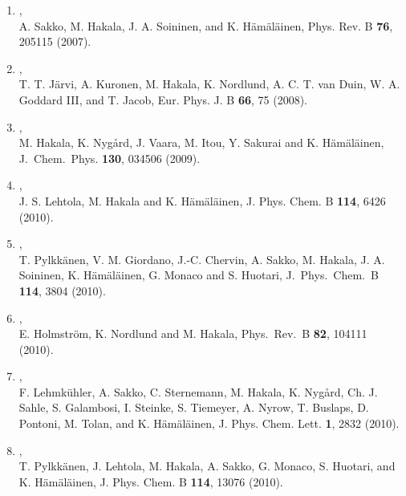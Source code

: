\documentclass[12pt,a4]{report}
\begin{document}
\begin{enumerate}
\item{},\\ A. Sakko, M. Hakala, J. A. Soininen, and K. H\"am\"al\"ainen,  
Phys. Rev. B {\bf 76}, 205115 (2007).

\item{},\\  T. T. J\"arvi, A. Kuronen, M. Hakala, K. Nordlund, A. C. T. van Duin, W. A. Goddard III, and T. Jacob,
Eur. Phys. J. B {\bf 66}, 75 (2008). 

\item{},\\ M. Hakala, K. Nyg\aa rd, 
J. Vaara, M. Itou, Y. Sakurai and K. H\"am\"al\"ainen,
J.~Chem.~Phys. {\bf 130}, 034506 (2009). 

\item{},\\ J. S. Lehtola, M. Hakala and K. H\"am\"al\"ainen, J. Phys. Chem. B {\bf 114}, 6426 (2010).

\item{},\\ T. Pylkk{\"a}nen, V. M. Giordano, J.-C. Chervin, A. Sakko, M. Hakala, J. A. Soininen, K. H\"am\"al\"ainen, G. Monaco and S. Huotari, J.\ Phys.\ Chem.\ B {\bf 114}, 3804 (2010).

\item{},\\ E. Holmstr{\"o}m, K. Nordlund and M. Hakala, Phys.\ Rev.\ B {\bf 82}, 104111 (2010).

\item{},\\ F. Lehmk{\"u}hler, A. Sakko, C. Sternemann,  M. Hakala, K. Nyg{\aa}rd, Ch. J. Sahle, S. Galambosi, I.
Steinke, S. Tiemeyer, A. Nyrow, T. Buslaps, D. Pontoni, M. Tolan, and K. H{\"a}m{\"a}l{\"a}inen, J. Phys. Chem. Lett. {\bf 1}, 2832 (2010).  

\item{},\\ T. Pylkk{\"a}nen, J. Lehtola, M. Hakala, A. Sakko, G. Monaco, S. Huotari, and K. H\"am\"al\"ainen, J. Phys. Chem. B {\bf 114}, 13076 (2010). 


\end{enumerate}
\end{document}
